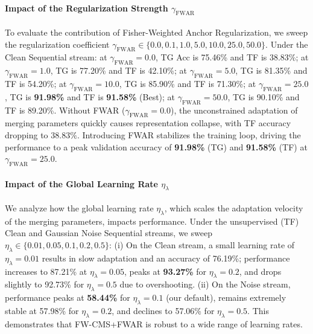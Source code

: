 \documentclass{article}
\begin{document}
\paragraph{Impact of the Regularization Strength $\gamma_{\text{FWAR}}$}
To evaluate the contribution of Fisher-Weighted Anchor Regularization, we sweep the regularization coefficient $\gamma_{\text{FWAR}} \in \{0.0, 0.1, 1.0, 5.0, 10.0, 25.0, 50.0\}$. Under the Clean Sequential stream:
at $\gamma_{\text{FWAR}} = 0.0$, TG Acc is 75.46\% and TF is 38.83\%;
at $\gamma_{\text{FWAR}} = 1.0$, TG is 77.20\% and TF is 42.10\%;
at $\gamma_{\text{FWAR}} = 5.0$, TG is 81.35\% and TF is 54.20\%;
at $\gamma_{\text{FWAR}} = 10.0$, TG is 85.90\% and TF is 71.30\%;
at $\gamma_{\text{FWAR}} = 25.0$, TG is \textbf{91.98\%} and TF is \textbf{91.58\%} (Best);
at $\gamma_{\text{FWAR}} = 50.0$, TG is 90.10\% and TF is 89.20\%.
Without FWAR ($\gamma_{\text{FWAR}} = 0.0$), the unconstrained adaptation of merging parameters quickly causes representation collapse, with TF accuracy dropping to $38.83\%$. Introducing FWAR stabilizes the training loop, driving the performance to a peak validation accuracy of \textbf{91.98\%} (TG) and \textbf{91.58\%} (TF) at $\gamma_{\text{FWAR}} = 25.0$.

\paragraph{Impact of the Global Learning Rate $\eta_{\lambda}$}
We analyze how the global learning rate $\eta_{\lambda}$, which scales the adaptation velocity of the merging parameters, impacts performance. Under the unsupervised (TF) Clean and Gaussian Noise Sequential streams, we sweep $\eta_{\lambda} \in \{0.01, 0.05, 0.1, 0.2, 0.5\}$:
(i) On the Clean stream, a small learning rate of $\eta_{\lambda} = 0.01$ results in slow adaptation and an accuracy of 76.19\%; performance increases to 87.21\% at $\eta_{\lambda} = 0.05$, peaks at \textbf{93.27\%} for $\eta_{\lambda} = 0.2$, and drops slightly to 92.73\% for $\eta_{\lambda} = 0.5$ due to overshooting.
(ii) On the Noise stream, performance peaks at \textbf{58.44\%} for $\eta_{\lambda} = 0.1$ (our default), remains extremely stable at 57.98\% for $\eta_{\lambda} = 0.2$, and declines to 57.06\% for $\eta_{\lambda} = 0.5$. This demonstrates that FW-CMS+FWAR is robust to a wide range of learning rates.
\end{document}
